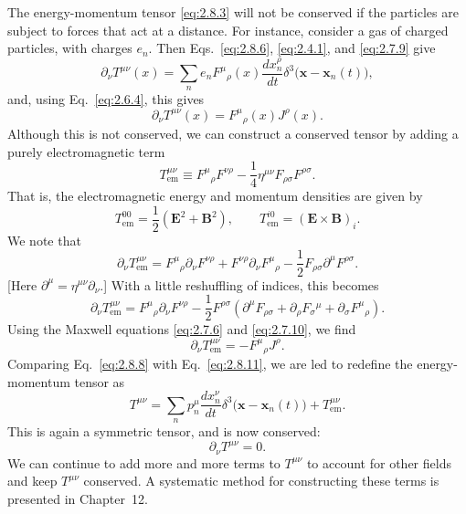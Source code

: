 The energy-momentum tensor \eqref{eq:2.8.3} will not be conserved if the
particles are subject to forces that act at a distance. For instance, consider
a gas of charged particles, with charges \(e_n\). Then
Eqs.~\eqref{eq:2.8.6}, \eqref{eq:2.4.1}, and \eqref{eq:2.7.9} give
\[
  \partial_\nu T^{\mu\nu}(x)
  =\sum_n e_nF^\mu{}_\rho(x)\frac{dx_n^\rho}{dt}
    \delta^3\bigl(\mathbf x-\mathbf x_n(t)\bigr),
\]
and, using Eq.~\eqref{eq:2.6.4}, this gives
\begin{equation}
  \partial_\nu T^{\mu\nu}(x)
  =F^\mu{}_\rho(x)J^\rho(x).
  \tag{2.8.8}\label{eq:2.8.8}
\end{equation}
Although this is not conserved, we can construct a conserved tensor by adding
a purely electromagnetic term
\begin{equation}
  T_{\mathrm{em}}^{\mu\nu}
  \equiv F^\mu{}_\rho F^{\nu\rho}
  -\frac14\eta^{\mu\nu}F_{\rho\sigma}F^{\rho\sigma}.
  \tag{2.8.9}\label{eq:2.8.9}
\end{equation}
That is, the electromagnetic energy and momentum densities are given by
\begin{equation}
  T_{\mathrm{em}}^{00}
  =\frac12(\mathbf E^2+\mathbf B^2),
  \qquad
  T_{\mathrm{em}}^{i0}=(\mathbf E\times\mathbf B)_i .
  \tag{2.8.10}\label{eq:2.8.10}
\end{equation}
We note that
\[
  \partial_\nu T_{\mathrm{em}}^{\mu\nu}
  =F^\mu{}_\rho\partial_\nu F^{\nu\rho}
   +F^{\nu\rho}\partial_\nu F^\mu{}_\rho
   -\frac12F_{\rho\sigma}\partial^\mu F^{\rho\sigma}.
\]
[Here \(\partial^\mu=\eta^{\mu\nu}\partial_\nu\).] With a little reshuffling
of indices, this becomes
\[
  \partial_\nu T_{\mathrm{em}}^{\mu\nu}
  =F^\mu{}_\rho\partial_\nu F^{\nu\rho}
   -\frac12F^{\rho\sigma}
   \left(
     \partial^\mu F_{\rho\sigma}
     +\partial_\rho F_\sigma{}^\mu
     +\partial_\sigma F^\mu{}_\rho
   \right).
\]
Using the Maxwell equations \eqref{eq:2.7.6} and \eqref{eq:2.7.10}, we find
\begin{equation}
  \partial_\nu T_{\mathrm{em}}^{\mu\nu}
  =-F^\mu{}_\rho J^\rho .
  \tag{2.8.11}\label{eq:2.8.11}
\end{equation}
Comparing Eq.~\eqref{eq:2.8.8} with Eq.~\eqref{eq:2.8.11}, we are led to
redefine the energy-momentum tensor as
\begin{equation}
  T^{\mu\nu}
  =\sum_n p_n^\mu\frac{dx_n^\nu}{dt}
    \delta^3\bigl(\mathbf x-\mathbf x_n(t)\bigr)
   +T_{\mathrm{em}}^{\mu\nu}.
  \tag{2.8.12}\label{eq:2.8.12}
\end{equation}
This is again a symmetric tensor, and is now conserved:
\begin{equation}
  \partial_\nu T^{\mu\nu}=0 .
  \tag{2.8.13}\label{eq:2.8.13}
\end{equation}
We can continue to add more and more terms to \(T^{\mu\nu}\) to account for
other fields and keep \(T^{\mu\nu}\) conserved. A systematic method for
constructing these terms is presented in Chapter~12.

